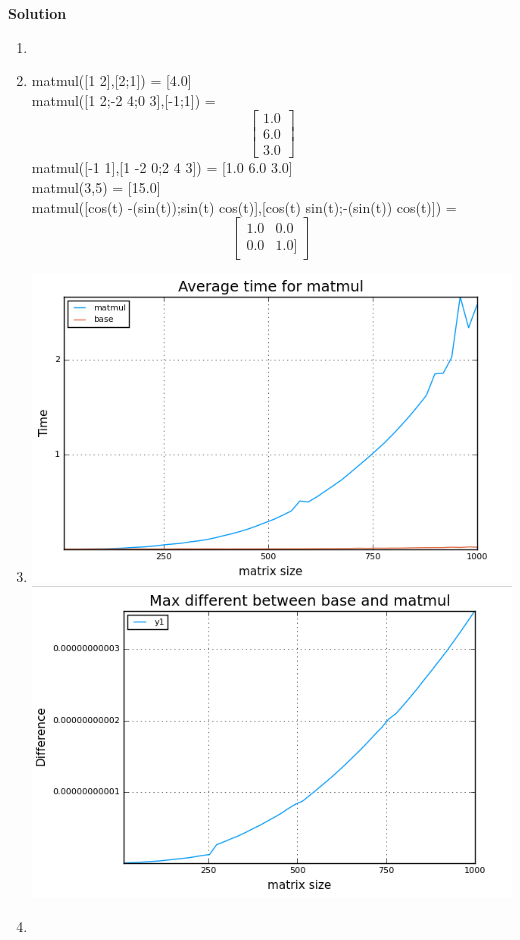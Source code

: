 \documentclass[]{article}
\begin{document}
\textbf{Solution} 
\begin{enumerate}
\def\labelenumi{\arabic{enumi}.}
\item

\item
matmul([1 2],[2;1]) = [4.0] \\
matmul([1 2;-2 4;0 3],[-1;1]) = 
\[ \begin{bmatrix}1.0 \\ 6.0 \\ 3.0
\end{bmatrix} \] 
matmul([-1 1],[1 -2 0;2 4 3]) = [1.0 6.0 3.0] \\
matmul(3,5) = [15.0] \\
matmul([cos(t) -(sin(t));sin(t) cos(t)],[cos(t) sin(t);-(sin(t)) cos(t)]) = 
\[ \begin{bmatrix}1.0 & 0.0 \\
0.0&1.0]
\end{bmatrix} \]
\item
\hfill \break
\includegraphics[width=\textwidth,keepaspectratio]{problem2partB.png}
\hfill \break
\includegraphics[width=\textwidth,keepaspectratio]{problem2partC.png}
\item


\end{enumerate}
\end{document}
